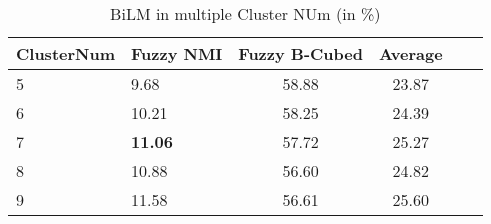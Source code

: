 \begin{table}[htbp!] %
    \centering
    \begin{tabular}{llcccc}
    \midrule
        ClusterNum   & Fuzzy NMI     & Fuzzy B-Cubed  & Average  \\
    \midrule
    5          & 9.68    & 58.88 & 23.87   \\
    6          & 10.21   & 58.25 & 24.39   \\
    7          & \bf{11.06} & 57.72 & 25.27 \\
    8          &10.88   & 56.60 & 24.82   \\
    9          &11.58   & 56.61 & 25.60   \\
    \bottomrule
    \end{tabular}
\caption{BiLM in multiple Cluster NUm (in \%)}
\label{tab:embedding}
\end{table}
